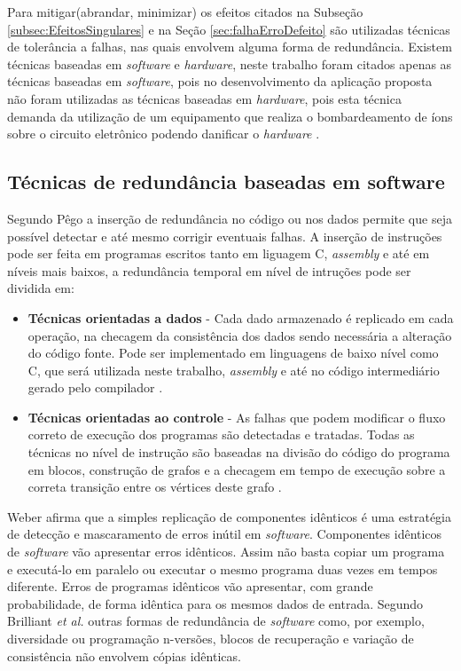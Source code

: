 Para mitigar(abrandar, minimizar) os efeitos citados na Subseção \ref{subsec:EfeitosSingulares} e na Seção \ref{sec:falhaErroDefeito} são utilizadas técnicas de tolerância a falhas, nas quais envolvem alguma forma de redundância.  
Existem técnicas baseadas em \textit{software} e \textit{hardware}, neste trabalho foram citados apenas as técnicas baseadas em \textit{software}, pois no desenvolvimento da aplicação proposta não foram utilizadas as técnicas baseadas em \textit{hardware}, pois esta técnica demanda da utilização de um equipamento que realiza o bombardeamento de íons sobre o circuito eletrônico podendo danificar o \textit{hardware} \cite{Weber:2002}.

\subsection{Técnicas de redundância baseadas em software}

Segundo Pêgo \cite{Pego:2014} a inserção de redundância no código ou nos dados permite que seja possível detectar e até mesmo corrigir eventuais falhas. A inserção de instruções pode ser feita em programas escritos tanto em liguagem C, \textit{assembly} e até em níveis mais baixos, a redundância temporal em nível de intruções pode ser dividida em:


\begin{itemize}
	\item \textbf{Técnicas orientadas a dados} - Cada dado armazenado é replicado em cada operação, na checagem da consistência dos dados sendo necessária a alteração do código fonte. Pode ser implementado em linguagens de baixo nível como C, que será utilizada neste trabalho, \textit{assembly} e até no código intermediário gerado pelo compilador \cite{Pego:2014}.
	
	\item \textbf{Técnicas orientadas ao controle} - As falhas que podem modificar o fluxo correto de execução dos programas são detectadas e tratadas. Todas as técnicas no nível de instrução são baseadas na divisão do código do programa em blocos, construção de grafos e a checagem em tempo de execução sobre a correta transição entre os vértices deste grafo \cite{Pego:2014}.  		 
	
\end{itemize}


Weber \cite{Weber:2002} afirma que a simples replicação de componentes idênticos é uma estratégia de detecção e mascaramento de erros inútil em \textit{software}. Componentes idênticos de \textit{software} vão apresentar erros idênticos. Assim não basta copiar um programa e executá-lo em paralelo ou executar o mesmo programa duas vezes em tempos diferente. Erros de programas idênticos vão apresentar, com grande probabilidade, de forma idêntica para os mesmos dados de entrada. Segundo Brilliant \textit{et al.}\cite{Brilliant:1990} outras formas de redundância de \textit{software} como, por exemplo, diversidade ou programação n-versões, blocos de recuperação e variação de consistência não envolvem cópias idênticas.

